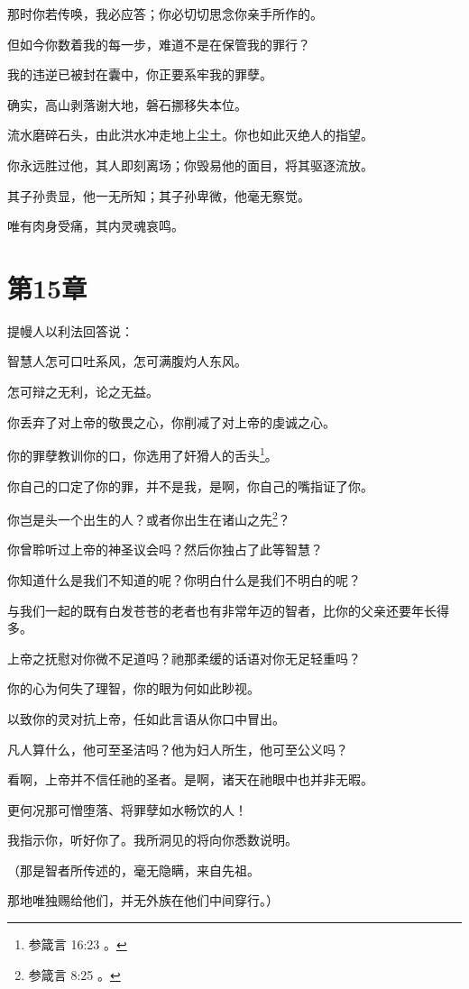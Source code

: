\documentclass[12pt,oneside]{book}
\begin{document}
那时你若传唤，我必应答；你必切切思念你亲手所作的。

但如今你数着我的每一步，难道不是在保管我的罪行？

我的违逆已被封在囊中，你正要系牢我的罪孽。

确实，高山剥落谢大地，磐石挪移失本位。

流水磨碎石头，由此洪水冲走地上尘土。你也如此灭绝人的指望。

你永远胜过他，其人即刻离场；你毁易他的面目，将其驱逐流放。

其子孙贵显，他一无所知；其子孙卑微，他毫无察觉。

唯有肉身受痛，其内灵魂哀鸣。


\chapter{第15章}
提幔人以利法回答说：

智慧人怎可口吐系风，怎可满腹灼人东风。

怎可辩之无利，论之无益。

你丢弃了对上帝的敬畏之心，你削减了对上帝的虔诚之心。

你的罪孽教训你的口，你选用了奸猾人的舌头\footnote{参箴言 16:23 。}。

你自己的口定了你的罪，并不是我，是啊，你自己的嘴指证了你。

你岂是头一个出生的人？或者你出生在诸山之先\footnote{参箴言 8:25 。}？

你曾聆听过上帝的神圣议会吗？然后你独占了此等智慧？

你知道什么是我们不知道的呢？你明白什么是我们不明白的呢？

与我们一起的既有白发苍苍的老者也有非常年迈的智者，比你的父亲还要年长得多。

上帝之抚慰对你微不足道吗？祂那柔缓的话语对你无足轻重吗？

你的心为何失了理智，你的眼为何如此眇视。

以致你的灵对抗上帝，任如此言语从你口中冒出。

凡人算什么，他可至圣洁吗？他为妇人所生，他可至公义吗？

看啊，上帝并不信任祂的圣者。是啊，诸天在祂眼中也并非无暇。

更何况那可憎堕落、将罪孽如水畅饮的人！

我指示你，听好你了。我所洞见的将向你悉数说明。

（那是智者所传述的，毫无隐瞒，来自先祖。

那地唯独赐给他们，并无外族在他们中间穿行。）
\end{document}
